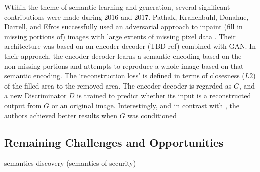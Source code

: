 \documentclass[11pt]{article}
\begin{document}
Wtihin the theme of semantic learning and generation, several significant contributions were made during 2016 and 2017.  Pathak, Krahenbuhl, Donahue, Darrell, and Efros successfully used an adversarial approach to inpaint (fill in missing portions of) images with large extents of missing pixel data \cite{pathakCVPR16context}.  Their architecture was based on an encoder-decoder (TBD ref) combined with GAN.  In their approach, the encoder-decoder learns a semantic encoding based on the non-missing portions and attempts to reproduce a whole image based on that semantic encoding.  The `reconstruction loss' is defined in terms of closesness ($L2$) of the filled area to the removed area. The encoder-decoder is regarded as $G$, and a new Discriminator $D$ is trained to predict whether its input is a reconstructed output from $G$ or an original image.  Interestingly, and in contrast with \cite{mirza2014conditional}, the authors achieved better results when $G$ was conditioned




\subsection{Remaining Challenges and Opportunities}

semantics discovery (semantics of security)
\end{document}
